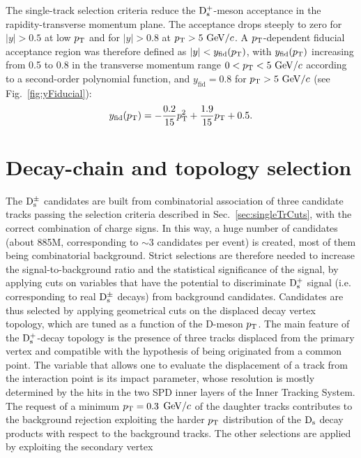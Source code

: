 The single-track selection criteria reduce the ${\rm D_s^+}$-meson acceptance
in the rapidity-transverse momentum plane. The acceptance drops 
steeply to zero for $|y| > 0.5$ at low $p_{\rm T}$ and for $|y| > 0.8$ 
at $p_{\rm T} > 5~\mathrm{GeV}/c$. A $p_{\rm T}$-dependent fiducial acceptance region was therefore defined as 
$|y| < y_{\mathrm{fid}}(p_{\rm T})$, with $y_{\mathrm{fid}}(p_{\rm T})$ increasing 
from 0.5 to 0.8 in the transverse momentum range $0 < p_{\rm T} < 5~\mathrm{GeV}/c$ 
according to a second-order polynomial function, and $y_{\mathrm{fid}}=0.8$ 
for $p_{\rm T} > 5~\mathrm{GeV}/c$ (see Fig.~\ref{fig:yFiducial}):
\begin{equation}
\label{eq:yFid}
y_{\rm fid} (p_{\rm T}) = -\frac{0.2}{15}p_{\rm T}^2 + \frac{1.9}{15}p_{\rm T} + 0.5.
\end{equation}

\section{Decay-chain and topology selection}
\label{sec:topolPP}
The ${\rm D_s^{\pm}}$ candidates are built from combinatorial 
 association of three candidate tracks passing the selection criteria 
 described in Sec.~\ref{sec:singleTrCuts}, with the correct combination of charge 
 signs. In this way, a huge number of candidates (about 885M, corresponding to $\sim$3 candidates per event) 
 is created, most of them being combinatorial background. 
 Strict selections are therefore needed to increase
 the signal-to-background ratio and the statistical significance of the signal,
 by applying cuts on variables that have the potential to discriminate
 ${\rm D_s^+}$ signal (i.e. corresponding to real ${\rm D_s^{\pm}}$ decays) 
 from background candidates. Candidates 
  are thus selected by applying geometrical cuts on the displaced decay vertex 
  topology, which are tuned as a function of the D-meson $p_{\rm T}$.
The main feature of the ${\rm D_s^+}$-decay topology is the presence of three tracks displaced from 
the primary vertex and compatible with the hypothesis of being originated from 
a common point. 
The variable that allows one to evaluate the displacement of a track from the interaction point is its 
impact parameter, whose resolution is mostly determined by the hits in the 
two SPD inner layers of the Inner Tracking System. \\
The request of a minimum $p_{\rm T} = 0.3$ $\mathrm{GeV}/c$ of the daughter tracks contributes to 
the background rejection exploiting the harder  $p_{\rm T}$ distribution of
the ${\rm D_s}$ decay products with respect to the background tracks. 
The other selections are applied by exploiting the secondary vertex
